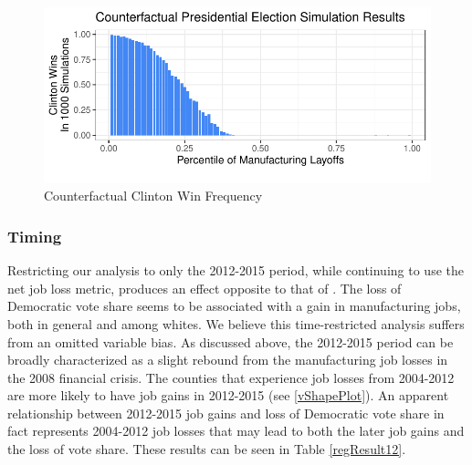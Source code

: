 \documentclass[]{AEA}
\begin{document}
\FloatBarrier
\begin{figure} \label{counterfactual3}
\caption{ Counterfactual Clinton Win Frequency}

\begin{center}\includegraphics{Final-Draft_files/figure-latex/unnamed-chunk-8-1} \end{center}



\FloatBarrier
\end{figure}
\FloatBarrier
\subsubsection{Timing}

Restricting our analysis to only the 2012-2015 period, while continuing
to use the net job loss metric, produces an effect opposite to that of
\cite{Baccini21}. The loss of Democratic vote share seems to be
associated with a gain in manufacturing jobs, both in general and among
whites. We believe this time-restricted analysis suffers from an omitted
variable bias. As discussed above, the 2012-2015 period can be broadly
characterized as a slight rebound from the manufacturing job losses in
the 2008 financial crisis. The counties that experience job losses from
2004-2012 are more likely to have job gains in 2012-2015 (see
\ref{vShapePlot}). An apparent relationship between 2012-2015 job gains
and loss of Democratic vote share in fact represents 2004-2012 job
losses that may lead to both the later job gains and the loss of vote
share. These results can be seen in Table \ref{regResult12}.
\FloatBarrier
\end{document}
